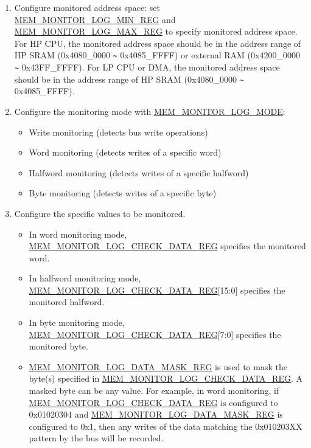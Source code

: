 \documentclass[main\_\_EN.tex]{subfiles}
\begin{document}
\begin{enumerate}
    \item Configure monitored address space: set \hyperref[regdesc:MEMMONITORLOGMINREG]{MEM\_MONITOR\_LOG\_MIN\_REG} and \hyperref[regdesc:MEMMONITORLOGMAXREG]{MEM\_MONITOR\_LOG\_MAX\_REG} to specify monitored address space. For HP CPU, the monitored address space should be in the address range of HP SRAM (0x4080\_0000 \verb+~+ 0x4085\_FFFF) or external RAM (0x4200\_0000 \verb+~+ 0x43FF\_FFFF). For LP CPU or DMA, the monitored address space should be in the address range of HP SRAM (0x4080\_0000 \verb+~+ 0x4085\_FFFF).
    \item Configure the monitoring mode with \hyperref[fielddesc:MEMMONITORLOGMODE]{MEM\_MONITOR\_LOG\_MODE}:
        \begin{itemize}
            \item Write monitoring (detects bus write operations)
            \item Word monitoring (detects writes of a specific word)
            \item Halfword monitoring (detects writes of a specific halfword)
            \item Byte monitoring (detects writes of a specific byte)
        \end{itemize}
    \item Configure the specific values to be monitored.
       \begin{itemize}
            \item In word monitoring mode, \hyperref[regdesc:MEMMONITORLOGCHECKDATAREG]{MEM\_MONITOR\_LOG\_CHECK\_DATA\_REG} specifies the monitored word.
            \item In halfword monitoring mode, \hyperref[regdesc:MEMMONITORLOGCHECKDATAREG]{MEM\_MONITOR\_LOG\_CHECK\_DATA\_REG}[15:0] specifies the monitored halfword.
            \item In byte monitoring mode, \hyperref[regdesc:MEMMONITORLOGCHECKDATAREG]{MEM\_MONITOR\_LOG\_CHECK\_DATA\_REG}[7:0] specifies the monitored byte.
            \item \hyperref[regdesc:MEMMONITORLOGDATAMASKREG]{MEM\_MONITOR\_LOG\_DATA\_MASK\_REG} is used to mask the byte(s) specified in \hyperref[regdesc:MEMMONITORLOGCHECKDATAREG]{MEM\_MONITOR\_LOG\_CHECK\_DATA\_REG}. A masked byte can be any value. For example, in word monitoring, if \hyperref[regdesc:MEMMONITORLOGCHECKDATAREG]{MEM\_MONITOR\_LOG\_CHECK\_DATA\_REG} is configured to 0x01020304 and \hyperref[regdesc:MEMMONITORLOGDATAMASKREG]{MEM\_MONITOR\_LOG\_DATA\_MASK\_REG} is configured to 0x1, then any writes of the data matching the 0x010203XX pattern by the bus will be recorded.

\end{itemize}
\end{enumerate}
\end{document}
